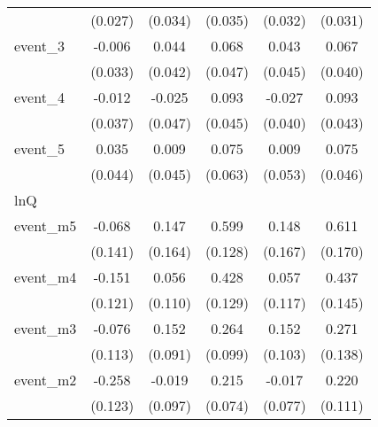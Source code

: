 {\begin{tabular}{l*{5}{c}}
            &     (0.027)         &     (0.034)         &     (0.035)         &     (0.032)         &     (0.031)         \\
[1em]
event\_3     &      -0.006         &       0.044         &       0.068         &       0.043         &       0.067         \\
            &     (0.033)         &     (0.042)         &     (0.047)         &     (0.045)         &     (0.040)         \\
[1em]
event\_4     &      -0.012         &      -0.025         &       0.093\sym{*}  &      -0.027         &       0.093\sym{*}  \\
            &     (0.037)         &     (0.047)         &     (0.045)         &     (0.040)         &     (0.043)         \\
[1em]
event\_5     &       0.035         &       0.009         &       0.075         &       0.009         &       0.075         \\
            &     (0.044)         &     (0.045)         &     (0.063)         &     (0.053)         &     (0.046)         \\
\hline
lnQ         &                     &                     &                     &                     &                     \\
event\_m5    &      -0.068         &       0.147         &       0.599\sym{***}&       0.148         &       0.611\sym{***}\\
            &     (0.141)         &     (0.164)         &     (0.128)         &     (0.167)         &     (0.170)         \\
[1em]
event\_m4    &      -0.151         &       0.056         &       0.428\sym{***}&       0.057         &       0.437\sym{**} \\
            &     (0.121)         &     (0.110)         &     (0.129)         &     (0.117)         &     (0.145)         \\
[1em]
event\_m3    &      -0.076         &       0.152         &       0.264\sym{**} &       0.152         &       0.271\sym{*}  \\
            &     (0.113)         &     (0.091)         &     (0.099)         &     (0.103)         &     (0.138)         \\
[1em]
event\_m2    &      -0.258\sym{*}  &      -0.019         &       0.215\sym{**} &      -0.017         &       0.220\sym{*}  \\
            &     (0.123)         &     (0.097)         &     (0.074)         &     (0.077)         &     (0.111)         \\

\end{tabular}}

